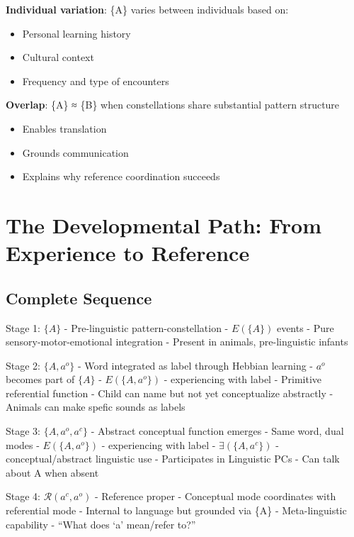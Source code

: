 \documentclass[12pt]{article}
\providecommand{\tightlist}{}   %
\begin{document}
\textbf{Individual variation}: \{A\} varies between individuals based on:

\begin{itemize}
\tightlist
\item
  Personal learning history
\item
  Cultural context
\item
  Frequency and type of encounters
\end{itemize}

\textbf{Overlap}: \{A\} ≈ \{B\} when constellations share substantial pattern structure

\begin{itemize}
\tightlist
\item
  Enables translation
\item
  Grounds communication
\item
  Explains why reference coordination succeeds
\end{itemize}

\section{The Developmental Path: From Experience to Reference}\label{the-developmental-path-from-experience-to-reference}

\subsection{Complete Sequence}\label{complete-sequence}

Stage 1: \(\{A\}\) - Pre-linguistic pattern-constellation - \(E(\{A\})\) events - Pure sensory-motor-emotional integration - Present in animals, pre-linguistic infants

Stage 2: \(\{A, a^o\}\) - Word integrated as label through Hebbian learning - \(a^o\) becomes part of \(\{A\}\) - \(E(\{A, a^o\})\) - experiencing with label - Primitive referential function - Child can name but not yet conceptualize abstractly - Animals can make spefic sounds as labels

Stage 3: \(\{A, a^o, a^c\}\) - Abstract conceptual function emerges - Same word, dual modes - \(E(\{A, a^o\})\) - experiencing with label - \(\exists(\{A, a^c\})\) - conceptual/abstract linguistic use - Participates in Linguistic PCs - Can talk about A when absent

Stage 4: \(\mathcal{R}(a^c, a^o)\) - Reference proper - Conceptual mode coordinates with referential mode - Internal to language but grounded via \{A\} - Meta-linguistic capability - ``What does `a' mean/refer to?''
\end{document}
